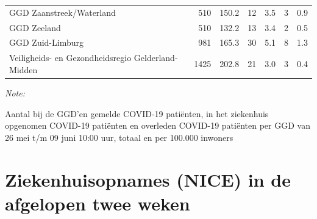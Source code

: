 \documentclass[
  english,
  man,floatsintext]{apa6}
\begin{document}
\begin{table}
\begin{threeparttable}
\begin{tabular}{lrrrrrr}
GGD Zaanstreek/Waterland & 510 & 150.2 & 12 & 3.5 & 3 & 0.9\\
GGD Zeeland & 510 & 132.2 & 13 & 3.4 & 2 & 0.5\\
GGD Zuid-Limburg & 981 & 165.3 & 30 & 5.1 & 8 & 1.3\\
Veiligheids- en Gezondheidsregio Gelderland-Midden & 1425 & 202.8 & 21 & 3.0 & 3 & 0.4\\
\bottomrule
\end{tabular}
\begin{tablenotes}
\item \textit{Note: } 
\item Aantal bij de GGD’en gemelde COVID-19 patiënten, in het ziekenhuis opgenomen COVID-19 patiënten en overleden COVID-19 patiënten per GGD van 26 mei t/m 09 juni 10:00 uur, totaal en per 100.000 inwoners
\end{tablenotes}
\end{threeparttable}
\endgroup{}
\end{table}

\newpage

\hypertarget{ziekenhuisopnames-nice-in-de-afgelopen-twee-weken}{%
\section{Ziekenhuisopnames (NICE) in de afgelopen twee weken}\label{ziekenhuisopnames-nice-in-de-afgelopen-twee-weken}}
\end{document}
